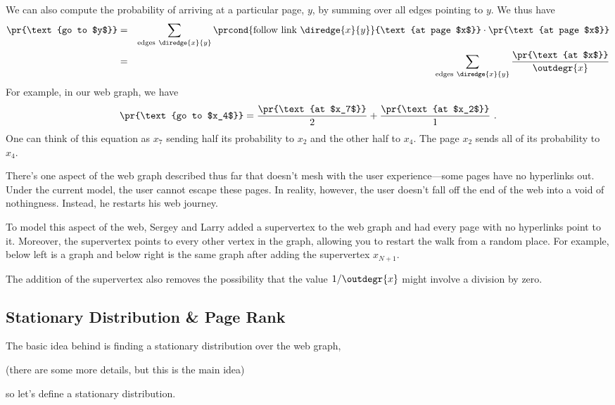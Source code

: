 We can also compute the probability of arriving at a particular page, $y$,
by summing over all edges pointing to $y$.  We thus have
\begin{eqnarray}
  \pr{\text{go to $y$}} &=&  \sum_{\text{edges}\ \diredge{x}{y}}
  \prcond{\text{follow link}\ \diredge{x}{y}}{\text{at page $x$}} \cdot
  \pr{\text{at page $x$}} \nonumber\\
  &=& \sum_{\text{edges}\ \diredge{x}{y}} \frac{\pr{\text{at
      $x$}}}{\outdegr{x}} \label{LN12:stepprob}
\end{eqnarray}
For example, in our web graph, we have
\[ \pr{\text{go to $x_4$}} = \frac{\pr{\text{at $x_7$}}}{2} +
\frac{\pr{\text{at $x_2$}}}{1} \ .
\]
One can think of this equation as $x_7$ sending half its probability to
$x_2$ and the other half to $x_4$. The page $x_2$ sends all of its
probability to $x_4$.

There's one aspect of the web graph described thus far that doesn't mesh
with the user experience---some pages have no hyperlinks out.  Under the
current model, the user cannot escape these pages.  In reality, however,
the user doesn't fall off the end of the web into a void of nothingness.
Instead, he restarts his web journey.

To model this aspect of the web, Sergey and Larry added a supervertex to the
web graph and had every page with no hyperlinks point to it.  Moreover,
the supervertex points to every other vertex in the graph, allowing you to
restart the walk from a random place.  For example, below left is a graph
and below right is the same graph after adding the supervertex $x_{N+1}$.

\bigskip\centerline{
  \hspace{2cm}
}\bigskip

The addition of the supervertex also removes the possibility that the value
$1/\outdegr{x}$ might involve a division by zero.

\subsection{Stationary Distribution \& Page Rank}

The basic idea behind  is finding a stationary
distribution over the web graph,
\begin{editingnotes}
(there are some more details, but this is the main idea)
\end{editingnotes}
so let's define a stationary distribution.

